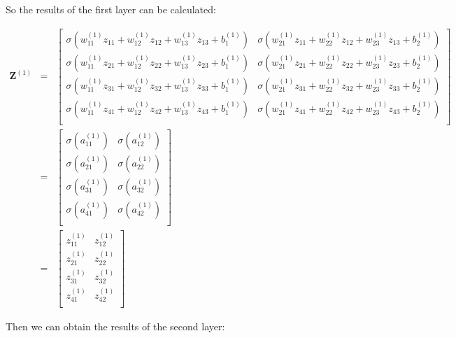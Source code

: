 \documentclass{article}
\begin{document}
\noindent So the results of the first layer can be calculated:

\begin{eqnarray}
\mathbf{Z}^{(1)} 
& = & \left[\begin{array}{ccc}
	\sigma(w^{(1)}_{11}z_{11} + w^{(1)}_{12}z_{12} + w^{(1)}_{13}z_{13} + b^{(1)}_1) &
	\sigma(w^{(1)}_{21}z_{11} + w^{(1)}_{22}z_{12} + w^{(1)}_{23}z_{13} + b^{(1)}_2) \\
	\sigma(w^{(1)}_{11}z_{21} + w^{(1)}_{12}z_{22} + w^{(1)}_{13}z_{23} + b^{(1)}_1) &
	\sigma(w^{(1)}_{21}z_{21} + w^{(1)}_{22}z_{22} + w^{(1)}_{23}z_{23} + b^{(1)}_2) \\
	\sigma(w^{(1)}_{11}z_{31} + w^{(1)}_{12}z_{32} + w^{(1)}_{13}z_{33} + b^{(1)}_1) &
	\sigma(w^{(1)}_{21}z_{31} + w^{(1)}_{22}z_{32} + w^{(1)}_{23}z_{33} + b^{(1)}_2) \\
	\sigma(w^{(1)}_{11}z_{41} + w^{(1)}_{12}z_{42} + w^{(1)}_{13}z_{43} + b^{(1)}_1) &
	\sigma(w^{(1)}_{21}z_{41} + w^{(1)}_{22}z_{42} + w^{(1)}_{23}z_{43} + b^{(1)}_2) \\
\end{array}
\right] \nonumber \\
& = & \left[\begin{array}{ccc}	
	\sigma(a^{(1)}_{11}) & \sigma(a^{(1)}_{12}) \\
	\sigma(a^{(1)}_{21}) & \sigma(a^{(1)}_{22}) \\
	\sigma(a^{(1)}_{31}) & \sigma(a^{(1)}_{32}) \\
	\sigma(a^{(1)}_{41}) & \sigma(a^{(1)}_{42}) \\
\end{array}
\right] \nonumber \\
& = & \left[\begin{array}{ccc}	
	z^{(1)}_{11} & z^{(1)}_{12} \\
	z^{(1)}_{21} & z^{(1)}_{22} \\
	z^{(1)}_{31} & z^{(1)}_{32} \\
	z^{(1)}_{41} & z^{(1)}_{42} \\
\end{array}
\right]
\end{eqnarray}

\noindent Then we can obtain the results of the second layer:
\end{document}
